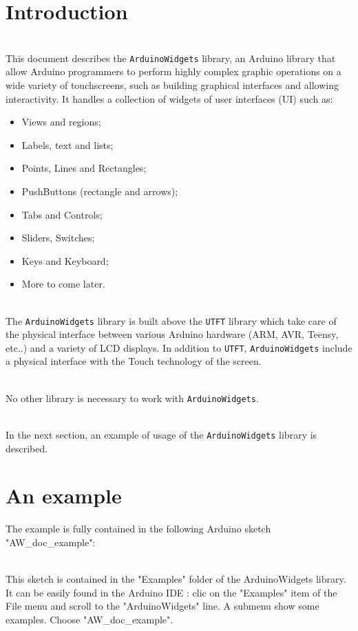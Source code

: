 \documentclass[a4paper,11pt]{extarticle}
\begin{document}
\newpage
\section{Introduction}

~\\This document describes the \texttt{ArduinoWidgets} library, an Arduino library that allow Arduino programmers to perform highly complex graphic operations on a wide variety of  touchscreens, such as building graphical interfaces and allowing interactivity. It handles a collection of widgets of user interfaces (UI) such as:

\begin{itemize}
  \item Views and regions;
  \item Labels, text and lists;
  \item Points, Lines and Rectangles;
  \item PushButtons (rectangle and arrows);
  \item Tabs and Controls;
  \item Sliders, Switches;
  \item Keys and Keyboard;
  \item More to come later. 
\end{itemize}

~\\The \texttt{ArduinoWidgets} library is built above the \texttt{UTFT} library which take care of the physical interface between various Arduino hardware (ARM, AVR, Teensy, etc..) and a variety of  LCD displays. In addition to \texttt{UTFT}, \texttt{ArduinoWidgets} include a physical interface with the Touch technology of the screen.

~\\No other library is necessary to work with \texttt{ArduinoWidgets}.

~\\In the next section, an example of usage of the \texttt{ArduinoWidgets} library is described.

\newpage
\section{An example}

The example is fully contained in the following Arduino sketch "AW\_doc\_example":

~\\This sketch is contained in the "Examples" folder of the ArduinoWidgets library. It can be easily found in the Arduino IDE : clic on the "Examples" item of the File menu and scroll to the "ArduinoWidgets" line. A submenu show some examples. Choose "AW\_doc\_example".
\end{document}
